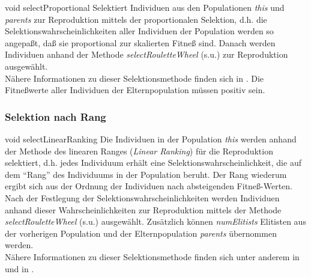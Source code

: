 \documentclass{report}
\begin{document}
\setNormalInstance
\setCorrectWidthThree{8pt}
\printMethodWithParamsSaved
{void}
{}
{selectProportional}
{Selektiert Individuen aus den Populationen {\em this} und {\em parents}
 zur Reproduktion mittels der proportionalen Selektion,
 d.h. die Selektionswahrscheinlichkeiten aller Individuen der Population
 werden so angepa{\ss}t, da{\ss} sie proportional zur skalierten
 Fitne{\ss} sind. Danach werden Individuen anhand der
 Methode {\em selectRouletteWheel} (s.u.) zur Reproduktion ausgew\"ahlt.\\
 N\"ahere Informationen zu dieser Selektionsmethode finden sich
 in \cite{EALib}.}
{Die Fitne{\ss}werte aller Individuen der Elternpopulation
                    m\"ussen positiv sein.}
\setCorrectWidthThree{4pt}

\newpage

\subsubsection{Selektion nach Rang}

\setNormalInstance
\setCorrectWidthThree{8pt}
\printMethodWithParamsSaved
{void}
{}
{selectLinearRanking}
{Die Individuen in der Population {\em this} werden anhand der 
 Methode des linearen Ranges ({\em Linear Ranking}) f\"ur die
 Reproduktion selektiert, d.h. jedes Individuum erh\"alt
 eine Selektionswahrscheinlichkeit, die auf dem ``Rang'' des
 Individuums in der Population beruht. Der Rang wiederum ergibt
 sich aus der Ordnung der Individuen nach absteigenden
 Fitne{\ss}-Werten. Nach der Festlegung der Selektionswahrscheinlichkeiten
 werden Individuen anhand dieser Wahrscheinlichkeiten zur Reproduktion 
 mittels der Methode {\em selectRouletteWheel} (s.u.) ausgew\"ahlt.
 Zus\"atzlich k\"onnen {\em numElitists} Elitisten
 aus der vorherigen Population und der Elternpopulation
 {\em parents} \"ubernommen werden.\\
 N\"ahere Informationen zu dieser Selektionsmethode finden sich
 unter anderem in \cite{Baker} und in \cite{AlgoWork}.}
{}
\setCorrectWidthThree{4pt}
\end{document}
